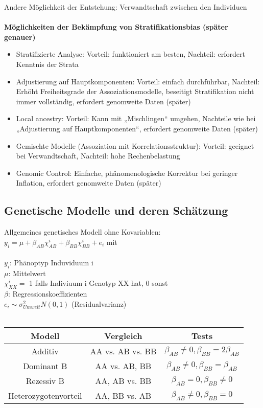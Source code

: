 Andere Möglichkeit der Entstehung: Verwandtschaft zwischen den Individuen
\\\\
\textbf{Möglichkeiten der Bekämpfung von Stratifikationsbias (später genauer)}
\begin{itemize}
	\item Stratifizierte Analyse: Vorteil: funktioniert am besten, Nachteil: erfordert Kenntnis der Strata
	\item Adjustierung auf Hauptkomponenten: Vorteil: einfach durchführbar, Nachteil: Erhöht Freiheitsgrade der Assoziationsmodelle, beseitigt Stratifikation nicht immer vollständig, erfordert genomweite Daten (später)
	\item Local ancestry: Vorteil: Kann mit „Mischlingen“ umgehen, Nachteile wie bei „Adjustierung auf Hauptkomponenten“, erfordert genomweite Daten (später)
	\item Gemischte Modelle (Assoziation mit Korrelationsstruktur): Vorteil: geeignet bei Verwandtschaft, Nachteil: hohe Rechenbelastung
	\item Genomic Control: Einfache, phänomenologische Korrektur bei geringer Inflation, erfordert genomweite Daten (später)
\end{itemize}

\subsection{Genetische Modelle und deren Schätzung}
Allgemeines genetisches Modell ohne Kovariablen:\\
$y_i=\mu + \beta_{AB}\chi^i_{AB} + \beta_{BB}\chi^i_{BB} + e_i$ mit\\\\
$y_i$: Phänoptyp Induviduum i\\
$\mu$: Mittelwert\\
$\chi^i_{XX}=$ 1 falls Indiviuum i Genotyp XX hat, 0 sonst\\
$\beta$: Regressionskoeffizienten\\
$e_i \sim \sigma^{2}_{Umwelt}N(0,1)$ (Residualvarianz)\\
\\
\begin{tabular}{|c|c|c|}
\hline
	Modell & Vergleich & Tests\\
\hline
	Additiv & AA vs. AB vs. BB & $\beta_{AB}\neq 0, \beta_{BB}=2\beta_{AB}$\\
\hline
	Dominant B & AA vs. AB, BB & $\beta_{AB}\neq 0, \beta_{BB}=\beta_{AB}$\\
\hline
	Rezessiv B & AA, AB vs. BB & $\beta_{AB}=0, \beta_{BB}\neq 0$\\
\hline
	Heterozygotenvorteil & AA, BB vs. AB & $\beta_{AB}\neq 0, \beta_{BB}=0$\\
\hline
\end{tabular}

